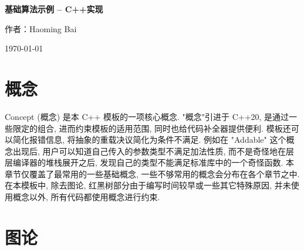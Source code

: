 \documentclass[a4paper]{ctexbook}
\begin{document}
\begin{titlepage}
  \centering
  \vspace*{2cm}


  {\Huge\bfseries 基础算法示例 -- C++实现\par}
  \vspace{2cm}
  {\Large 作者：Haoming Bai\par}
  \vfill


  {\large \today\par}
\end{titlepage}

\clearpage
{}
\tableofcontents
\clearpage

\mainmatter

\chapter{概念}

Concept (概念) 是本 C++ 模板的一项核心概念. "概念"引进于 C++20, 是通过一些限定的组合, 进而约束模板的适用范围, 同时也给代码补全器提供便利. 模板还可以简化报错信息, 将抽象的重载决议简化为条件不满足. 例如在 "Addable" 这个概念出现后, 用户可以知道自己传入的参数类型不满足加法性质, 而不是奇怪地在层层编译器的堆栈展开之后, 发现自己的类型不能满足标准库中的一个奇怪函数. 本章节仅覆盖了最常用的一些基础概念, 一些不够常用的概念会分布在各个章节之中. 在本模板中, 除去图论, 红黑树部分由于编写时间较早或一些其它特殊原因, 并未使用概念以外, 所有代码都使用概念进行约束.



\chapter{图论}
\end{document}
